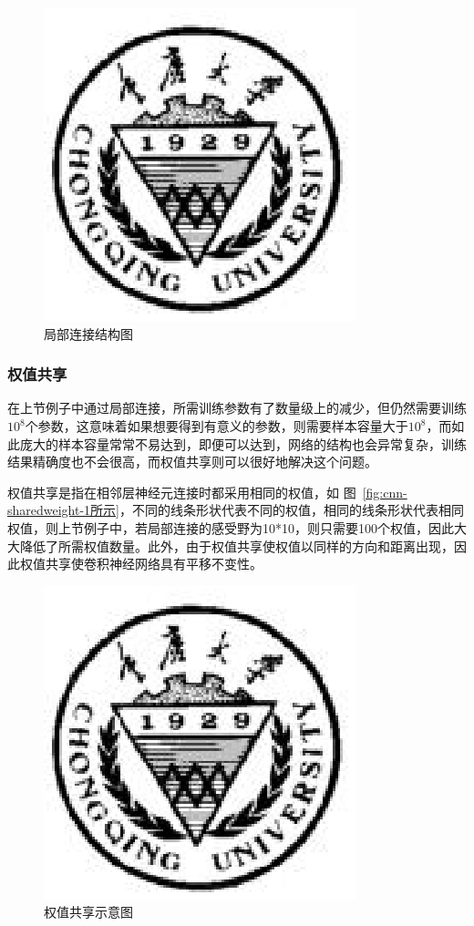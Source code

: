 \documentclass[bachelor,zhspacing]{cqu}  %
\begin{document}
\begin{figure}[htbp]
\centering
\includegraphics{./pic/cqu.eps}
\caption{局部连接结构图}\label{fig:cnn-locallink-2}
\end{figure}

\subsubsection{权值共享}\label{ux6743ux503cux5171ux4eab}

在上节例子中通过局部连接，所需训练参数有了数量级上的减少，但仍然需要训练\(10^{8}\)个参数，这意味着如果想要得到有意义的参数，则需要样本容量大于\(10^{8}\)，而如此庞大的样本容量常常不易达到，即便可以达到，网络的结构也会异常复杂，训练结果精确度也不会很高，而权值共享则可以很好地解决这个问题。

权值共享是指在相邻层神经元连接时都采用相同的权值，如
图~\ref{fig:cnn-sharedweight-1所示}，不同的线条形状代表不同的权值，相同的线条形状代表相同权值，则上节例子中，若局部连接的感受野为10*10，则只需要100个权值，因此大大降低了所需权值数量。此外，由于权值共享使权值以同样的方向和距离出现，因此权值共享使卷积神经网络具有平移不变性。

\begin{figure}[htbp]
\centering
\includegraphics{./pic/cqu.eps}
\caption{权值共享示意图}\label{fig:cnn-sharedweight-1}
\end{figure}
\end{document}
